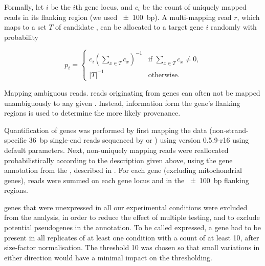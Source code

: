 Formally, let \(i\) be the \(i\)th \trna gene locus, and \(c_i\) be the count of
uniquely mapped reads in its flanking region (we used \SI{\pm100}{bp}). A
multi-mapping read \(r\), which maps to a set \(T\) of candidate \trna[s], can
be allocated to a target \trna gene \(i\) randomly with probability

\begin{equation}
    p_i = \begin{cases}
        c_i\left(\sum_{x \in T}c_x\right)^{-1} &
            \text{if \(\sum_{x \in T}c_x \neq 0\),} \\
        \vert T \rvert^{-1} & \text{otherwise.}
    \end{cases}
\end{equation}

    {Mapping ambiguous \chip reads.}
    {\chip reads originating from \trna genes can often not be mapped
    unambiguously to any given \trna. Instead, information form the gene’s
    flanking regions is used to determine the more likely provenance.}

Quantification of \trna genes was performed by first mapping the  \chipseq
data (non-strand-specific \SI{36}{bp} single-end reads sequenced by
  or ) using
 version 0.5.9-r16 \citep{Li:2009a} using default parameters. Next,
non-uniquely mapping reads were reallocated probabilistically according to the
description given above, using the \trna gene annotation from the , described in \citet{Chan:2009}. For each \trna gene (excluding
mitochondrial \trna genes), reads were summed on each \trna gene locus and in
the \SI{\pm100}{bp} flanking regions.

\trna genes that were unexpressed in all our experimental conditions were
excluded from the analysis, in order to reduce the effect of multiple testing,
and to exclude potential pseudogenes in the annotation. To be called expressed,
a \trna gene had to be present in all replicates of at least one condition with
a count of at least \num{10}, after size-factor normalisation. The threshold
\num{10} was chosen so that small variations in either direction would have a
minimal impact on the thresholding.
